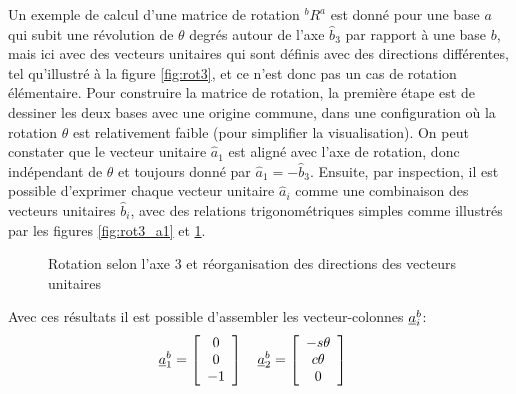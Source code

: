 \begin{example}
%
Un exemple de calcul d'une matrice de rotation $^bR^a$ est donné pour une base $a$ qui subit une révolution de $\theta$ degrés autour de l'axe $\hat{b}_3$ par rapport à une base $b$, mais ici avec des vecteurs unitaires qui sont définis avec des directions différentes, tel qu'illustré à la figure \ref{fig:rot3}, et ce n'est donc pas un cas de rotation élémentaire. Pour construire la matrice de rotation, la première étape est de dessiner les deux bases avec une origine commune, dans une configuration où la rotation $\theta$ est relativement faible (pour simplifier la visualisation). On peut constater que le vecteur unitaire $\hat{a}_1$ est aligné avec l'axe de rotation, donc indépendant de $\theta$ et toujours donné par $\hat{a}_1=-\hat{b}_3$. Ensuite, par inspection, il est possible d'exprimer chaque vecteur unitaire $\hat{a}_i$ comme une combinaison des vecteurs unitaires $\hat{b}_i$, avec des relations trigonométriques simples comme illustrés par les figures \ref{fig:rot3_a1} et \ref{fig:rot3_a2}. 
%
\begin{figure}[H]
        \centering
				\hspace{20pt}
				\hspace{20pt}
        \caption{Rotation selon l'axe 3 et réorganisation des directions des vecteurs unitaires}
				\label{fig:rot3_a2}
\end{figure}
%
Avec ces résultats il est possible d'assembler les vecteur-colonnes $\underline{a}_i^b$:
\begin{align}
\col{a}_1^b = \left[ \begin{array}{c} 0 \\ 0 \\ -1  \end{array} \right] \quad
\col{a}_2^b = \left[ \begin{array}{c} -s\theta \\ c\theta \\ 0 \end{array} \right] \quad

\end{align}
\end{example}
